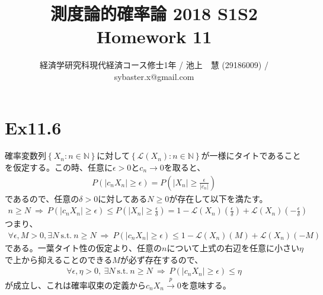 \documentclass{article}
\begin{document}
\title{測度論的確率論 2018 S1S2 \\ 
Homework 11}
\author{経済学研究科現代経済コース修士1年 / 池上　慧 (29186009) / sybaster.x@gmail.com}
\maketitle


\section{Ex11.6}
確率変数列$\left\{ X_n : n \in \mathbb{N}\right\}$に対して$\left\{ \mathcal{L}(X_n) : n \in \mathbb{N} \right\}$が一様にタイトであることを仮定する。この時、任意に$\epsilon > 0$と$c_n \to 0$を取ると、
\begin{align*}
	P\left( \left| c_n X_n \right| \geq \epsilon \right) = P\left( \left| X_n \right| \geq \frac{\epsilon}{|c_n|} \right)
\end{align*}
であるので、任意の$\delta > 0$に対してある$N \geq 0$が存在して以下を満たす。
\begin{align*}
	n\geq N\ \Rightarrow\ P\left( \left| c_n X_n \right| \geq \epsilon \right) \leq P\left( \left| X_n \right| \geq \frac{\epsilon}{\delta} \right) = 1-\mathcal{L}(X_n)\left( \frac{\epsilon}{\delta} \right) + \mathcal{L}(X_n)\left(- \frac{\epsilon}{\delta} \right)
\end{align*}
つまり、
\begin{align*}
	\forall \epsilon,M > 0, \exists N\ \text{s.t.}\ n\geq N\ \Rightarrow\ P\left( \left| c_n X_n \right| \geq \epsilon \right) \leq 1-\mathcal{L}(X_n)\left( M \right) + \mathcal{L}(X_n)\left(-M \right)
\end{align*}
である。一葉タイト性の仮定より、任意の$n$について上式の右辺を任意に小さい$\eta$で上から抑えることのできる$M$が必ず存在するので、
\begin{align*}
	\forall \epsilon, \eta > 0,\ \exists N\ \text{s.t.}\ n\geq N\ \Rightarrow\ P\left( \left| c_n X_n \right| \geq \epsilon \right) \leq \eta
\end{align*}
が成立し、これは確率収束の定義から$c_nX_n\xrightarrow{p}0$を意味する。
\end{document}
